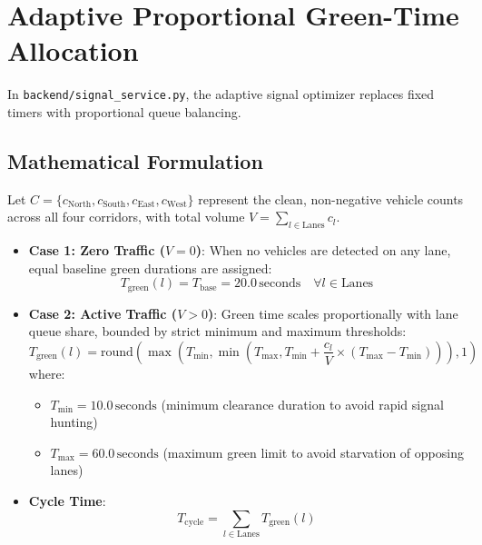 \documentclass[11pt,a4paper,oneside]{report}
\begin{document}
\section{Adaptive Proportional Green-Time Allocation}
In \texttt{backend/signal\_service.py}, the adaptive signal optimizer replaces fixed timers with proportional queue balancing.

\subsection{Mathematical Formulation}
Let $C = \{c_{\text{North}}, c_{\text{South}}, c_{\text{East}}, c_{\text{West}}\}$ represent the clean, non-negative vehicle counts across all four corridors, with total volume $V = \sum_{l \in \text{Lanes}} c_l$.
\begin{itemize}[leftmargin=*]
    \item \textbf{Case 1: Zero Traffic ($V = 0$)}:
    When no vehicles are detected on any lane, equal baseline green durations are assigned:
    \begin{equation}
    T_{\text{green}}(l) = T_{\text{base}} = 20.0\,\text{seconds} \quad \forall l \in \text{Lanes}
    \end{equation}
    \item \textbf{Case 2: Active Traffic ($V > 0$)}:
    Green time scales proportionally with lane queue share, bounded by strict minimum and maximum thresholds:
    \begin{equation}
    T_{\text{green}}(l) = \text{round}\left( \max\left(T_{\text{min}}, \min\left(T_{\text{max}}, T_{\text{min}} + \frac{c_l}{V} \times (T_{\text{max}} - T_{\text{min}})\right)\right), 1 \right)
    \end{equation}
    where:
    \begin{itemize}
        \item $T_{\text{min}} = 10.0\,\text{seconds}$ (minimum clearance duration to avoid rapid signal hunting)
        \item $T_{\text{max}} = 60.0\,\text{seconds}$ (maximum green limit to avoid starvation of opposing lanes)
    \end{itemize}
    \item \textbf{Cycle Time}:
    \begin{equation}
    T_{\text{cycle}} = \sum_{l \in \text{Lanes}} T_{\text{green}}(l)
    \end{equation}
\end{itemize}
\end{document}
